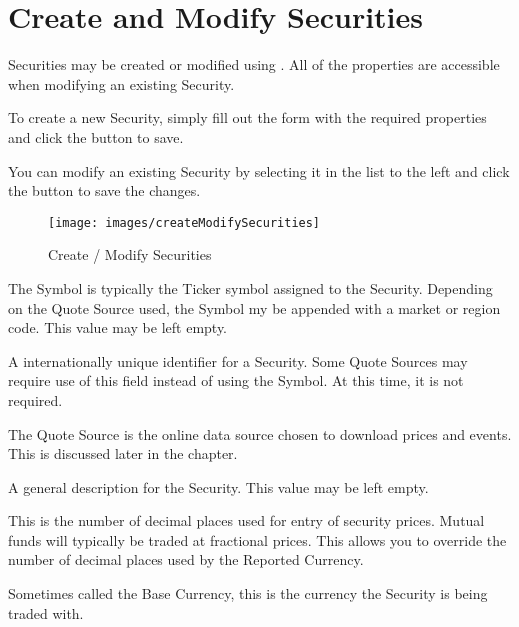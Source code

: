 \documentclass[letterpaper,12pt]{book}
\begin{document}
    
    \section{Create and Modify Securities}
    
    Securities may be created or modified using .  All of the properties are
    accessible when modifying an existing Security.
    
    To create a new Security, simply fill out the form with the required properties and click the  button to save.
    
    You can modify an existing Security by selecting it in the list to the left and click 
    the  button to save the changes.
    
    \begin{figure}[h]
        \caption{Create / Modify Securities}
        \texttt{[image: images/createModifySecurities]}
    \end{figure}

    \begin{description}[style=nextline]
        \item[Symbol \textit{(required)}]
        The Symbol is typically the Ticker symbol assigned to the Security.  Depending on the Quote Source used,
        the Symbol my be appended with a market or region code. This value may be left empty.
        \item[CUSIP / ISIN]
        A internationally unique identifier for a Security.  Some Quote Sources may require use of this field
        instead of using the Symbol.  At this time, it is not required. 
        \item[Quote Source \textit{(required)}]
        The Quote Source is the online data source chosen to download prices and events.  This is discussed later 
        in the chapter.
        \item[Description]
        A general description for the Security.  This value may be left empty.
        \item[Scale \textit{(required)}]
        This is the number of decimal places used for entry of security prices.  Mutual funds will typically
        be traded at fractional prices.  This allows you to override the number of decimal places used by the
        Reported Currency.
        \item[Reported Currency \textit{(required)}]
        Sometimes called the Base Currency, this is the currency the Security is being traded with.        
    \end{description}        
    
\end{document}
